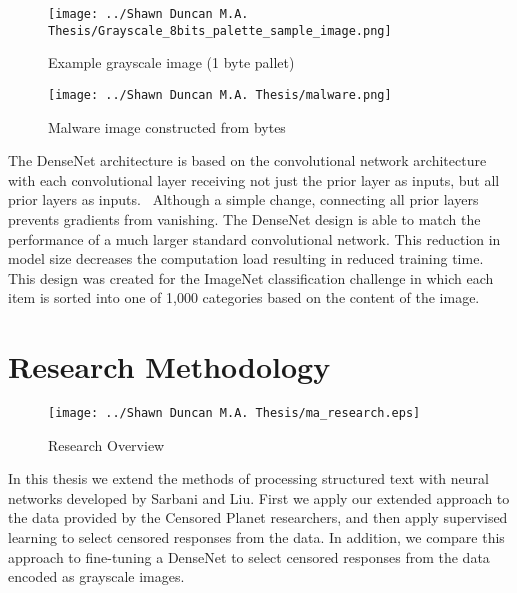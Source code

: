 \begin{figure}[htb]
    \centering
    \texttt{[image: ../Shawn Duncan M.A. Thesis/Grayscale\_8bits\_palette\_sample\_image.png]}
    \caption{Example grayscale image (1 byte pallet)}
    \label{fig:parrot}
\end{figure}
\begin{figure}[htb]
    \centering
    \texttt{[image: ../Shawn Duncan M.A. Thesis/malware.png]}
    \caption{Malware image constructed from bytes}
    \label{fig:malware}
\end{figure}

The DenseNet architecture is based on the convolutional network architecture
with each convolutional layer receiving not just the prior layer as inputs, but
all prior layers as inputs.~\cite{huang_densely_2017} Although a simple change,
connecting all prior layers prevents gradients from vanishing.  The DenseNet
design is able to match the performance of a much larger standard convolutional
network.  This reduction in model size decreases the computation load resulting
in reduced training time. This design was created for the ImageNet
classification challenge in which each item is sorted into one of 1,000
categories based on the content of the image.~\cite{li_fei-fei_imagenet_2012} 

\section{Research Methodology}\label{sec:research}
\begin{figure}[ht]
    \centering
    \texttt{[image: ../Shawn Duncan M.A. Thesis/ma\_research.eps]}
    \caption{Research Overview}
    \label{fig:process}
\end{figure}
In this thesis we extend the methods of processing structured text with neural networks developed by Sarbani and Liu. First we apply our extended approach to the data provided by the Censored Planet researchers, and then apply supervised learning to select censored responses from the data.  In addition, we compare this approach to fine-tuning a DenseNet to select censored responses from the data encoded as grayscale images.

